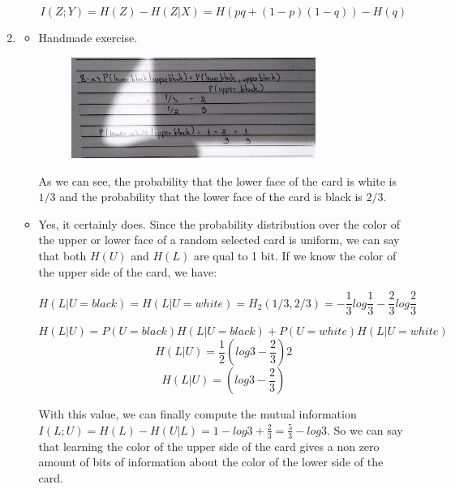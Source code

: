 \documentclass{article}
\begin{document}
\begin{enumerate}
\begin{enumerate}
		            \[I(Z; Y) = H(Z) - H(Z | X) = H(pq + (1-p)(1-q)) - H(q)\]
	      \end{enumerate}
	\item
	      \begin{itemize}
		      \item Handmade exercise.
		            \begin{figure}[H]
			            \centering
			            \includegraphics[width=0.8\textwidth]{images/8.jpg}
		            \end{figure}
		            As we can see, the probability that the lower face of the card is white is \(1/3\) and the probability that the lower face of the card is black is \(2/3\).
		      \item Yes, it certainly does. Since the probability distribution over the color of the upper or lower face of a random selected card is uniform, we can say that both \(H(U)\) and \(H(L)\) are qual to 1 bit. If we know the color of the upper side of the card, we have:

		            \[H(L | U = black) = H(L | U = white) = H_2(1/3, 2/3) = -\frac{1}{3} log \frac{1}{3} - \frac{2}{3} log \frac{2}{3}\]

		            \[H(L | U) = P(U = black) H(L | U = black) + P(U = white) H(L | U = white)\]
		            \[H(L | U) = \frac{1}{2} (log 3 - \frac{2}{3}) 2\]
		            \[H(L | U) = (log 3 - \frac{2}{3})\]

		            With this value, we can finally compute the mutual information \(I(L;U) = H(L) - H(U | L) = 1 - log 3 + \frac{2}{3} = \frac{5}{3} - log3\). So we can say that learning the color of the upper side of the card gives a non zero amount of bits of information about the color of the lower side of the card.
	      \end{itemize}
\end{enumerate}
\end{document}
